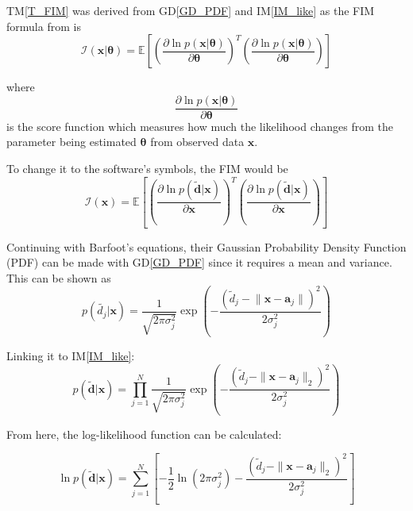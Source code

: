\documentclass[12pt]{article}
\newcommand{\dref}[1]{GD\ref{#1}}
\newcommand{\tref}[1]{TM\ref{#1}}
\newcommand{\iref}[1]{IM\ref{#1}}
\begin{document}
\tref{T_FIM} was derived from \dref{GD_PDF} and \iref{IM_like} as the FIM formula from \cite{Barfoot2017} is
\begin{displaymath}
  \boldsymbol{\mathcal{I}}(\mathbf{x} | \boldsymbol{\theta}) = \mathbb{E} \left[
\left( \frac{\partial \ln p(\mathbf{x} | \boldsymbol{\theta})}{\partial \boldsymbol{\theta}} \right)^{T}
\left( \frac{\partial \ln p(\mathbf{x} | \boldsymbol{\theta})}{\partial \boldsymbol{\theta}} \right)
\right]
\end{displaymath}

where\\ 
\[\frac{\partial \ln p(\mathbf{x} | \boldsymbol{\theta})}{\partial \boldsymbol{\theta}}\] is the score function which measures how much the likelihood changes from the parameter being estimated $\boldsymbol{\theta}$ from observed data $\mathbf{x}$.

To change it to the software's symbols, the FIM would be
\begin{displaymath}
  \boldsymbol{\mathcal{I}}(\mathbf{x}) = \mathbb{E} \left[
  \left( \frac{\partial \ln p(\mathbf{\tilde{d}} | \mathbf{x})}{\partial \mathbf{x}} \right)^{T}
  \left( \frac{\partial \ln p(\mathbf{\tilde{d}} | \mathbf{x})}{\partial \mathbf{x}} \right)
  \right]
\end{displaymath} 

Continuing with Barfoot's equations, their Gaussian Probability Density Function (PDF) can be made with \dref{GD_PDF} since it requires a mean and variance. This can be shown as
\begin{displaymath}
  p(\tilde{d_j} | \mathbf{x}) = \frac{1}{\sqrt{2\pi\sigma_j^2}} 
  \exp \left( 
  -\frac{(\tilde{d}_j - \lVert\mathbf{x} - \mathbf{a}_j\rVert)^2}{2\sigma_j^2} 
  \right)
\end{displaymath}

Linking it to \iref{IM_like}:
\begin{displaymath}
  p(\tilde{\mathbf{d}} | \mathbf{x}) = \prod_{j=1}^{N} 
  \frac{1}{\sqrt{2\pi\sigma_j^2}} 
  \exp \left( 
  -\frac{(\tilde{d}_j - \|\mathbf{x} - \mathbf{a}_j\|_2)^2}{2\sigma_j^2} 
  \right)
\end{displaymath}

From here, the log-likelihood function can be calculated:

\begin{displaymath}
  \ln p(\tilde{\mathbf{d}} | \mathbf{x}) = \sum_{j=1}^{N} 
  \left[ -\frac{1}{2} \ln (2\pi\sigma_j^2) 
  - \frac{(\tilde{d}_j - \|\mathbf{x} - \mathbf{a}_j\|_2)^2}{2\sigma_j^2} 
  \right]
\end{displaymath}
\end{document}
